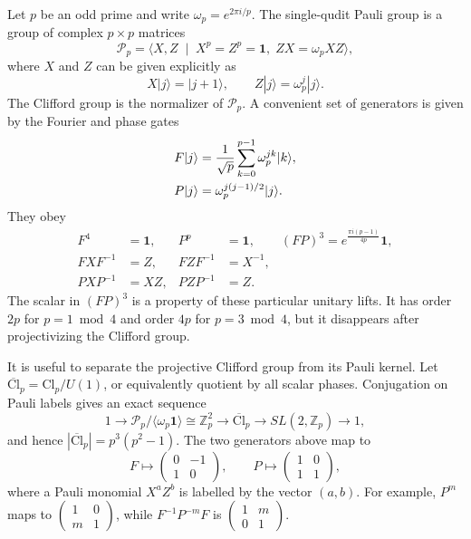 \documentclass[aps,twocolumn,prx,floatfix,preprintnumbers, nofootinbib,10pt]{revtex4-2}
\numberwithin{equation}{section}
\theoremstyle{definition}
\theoremstyle{remark}
\theoremstyle{claim}
\newcommand{\be}{\begin{equation}}
\newcommand{\ee}{\end{equation}}
\newcommand{\ba}{\begin{aligned}}
\newcommand{\ea}{\end{aligned}}
\newcommand{\Cl}{\text{Cl}}
\newcommand{\Z}{{\mathbb Z}}
\newcommand{\cP}{\mathcal{P}}
\begin{document}
Let $p$ be an odd prime and write $\omega_p=e^{2\pi i/p}$.  The single-qudit
Pauli group is a group of complex $p \times p$ matrices
\be
\cP_p=\langle X, Z \; \mid \; X^p = Z^p = \bm{1},\; ZX = \omega_p XZ \rangle ,
\ee
where $X$ and $Z$ can be given explicitly as
\be
  X|j\rangle=|j+1\rangle,\qquad
  Z|j\rangle=\omega_p^j|j\rangle .
\ee
The Clifford group is the normalizer of $\cP_p$.  A convenient set of
generators is given by the Fourier and phase gates \cite{Farinholt:2014wul}
\be
\ba
F|j\rangle&={1\over\sqrt p}\sum_{k=0}^{p-1}\omega_p^{jk}|k\rangle,\\
P|j\rangle&=\omega_p^{j(j-1)/2}|j\rangle .
\ea
\ee
They obey
\begin{align}\label{eq:quditCliffordActions}
 F^4 &= \bm{1}, & P^p &= \bm{1}, & (FP)^3 = e^{\frac{\pi i (p-1)}{4p}} \bm{1}, \nonumber \\
 F X F^{-1}&=Z, & F Z F^{-1} &= X^{-1}, \nonumber \\
P X P^{-1}&=X Z, & P Z P^{-1} &= Z .
\end{align}
The scalar in $(FP)^3$ is a property of these particular unitary lifts.  It has
order $2p$ for $p=1\bmod4$ and order $4p$ for $p=3\bmod4$, but it disappears
after projectivizing the Clifford group.

It is useful to separate the projective Clifford group from its Pauli kernel.
Let $\overline{\Cl}_p=\Cl_p/U(1)$, or equivalently quotient by all scalar
phases.  Conjugation on Pauli labels gives an exact sequence
\be\label{eq:projectiveClifford}
1\longrightarrow \cP_p/\langle\omega_p\bm1\rangle
\cong \Z_p^2
\longrightarrow \overline{\Cl}_p
\longrightarrow SL(2,\Z_p)
\longrightarrow 1,
\ee
and hence $|\overline{\Cl}_p|=p^3(p^2-1)$.  The two generators above map to
\be\label{eq:FPmatrices}
  F\longmapsto
  \begin{pmatrix}0&-1\\ 1&0\end{pmatrix},
  \qquad
  P\longmapsto
  \begin{pmatrix}1&0\\ 1&1\end{pmatrix},
\ee
where a Pauli monomial $X^aZ^b$ is labelled by the vector $(a,b)$.
For example, $P^m$ maps to 
$\left(\begin{smallmatrix}1&0\\ m&1\end{smallmatrix}\right)$, while
$F^{-1}P^{-m}F$ is 
$\left(\begin{smallmatrix}1&m\\0&1\end{smallmatrix}\right)$.
\end{document}
